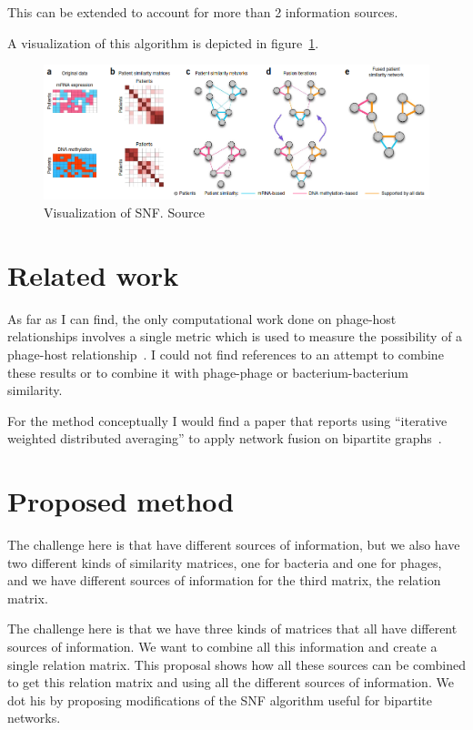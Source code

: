 \documentclass{article}
\begin{document}
This can be extended to account for more than 2 information sources.

A visualization of this algorithm is depicted in figure~\ref{fig:sim}.

\begin{figure}[ht]
    \centering
    \includegraphics[width=1\textwidth]{img/sim.png}
    \caption{Visualization of SNF. Source~\cite{wang2014similarity}}\label{fig:sim}
\end{figure}

\section{Related work}

As far as I can find, the only computational work done on phage-host relationships 
involves a single metric which is used to measure the possibility of a phage-host relationship~\cite{edwards2016computational}.
I could not find references to an attempt to combine these results or to combine
it with phage-phage or bacterium-bacterium similarity.

For the method conceptually I would find a paper that reports using ``iterative weighted distributed averaging''
to apply network fusion on bipartite graphs~\cite{khan2007distributed}.

\section{Proposed method}

The challenge here is that have different sources of information, 
but we also have two different kinds of similarity matrices, one for bacteria
and one for phages, and we have different sources of information for the third
matrix, the relation matrix. 

The challenge here is that we have three kinds of matrices that all have
different sources of information. We want to combine all this information
and create a single relation matrix.
This proposal shows how all these sources can be
combined to get this relation matrix and using all the different sources of information.
We dot his by proposing modifications of the SNF algorithm useful for bipartite networks.
\end{document}
